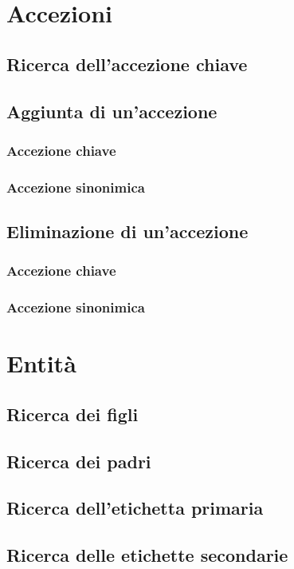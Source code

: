 \documentclass[10pt,a4paper,headinclude,footinclude,hidelinks]{scrreprt} %
\begin{document}
	\section{Accezioni}
	\subsection{Ricerca dell'accezione chiave}
	\subsection{Aggiunta di un'accezione}
	\subsubsection{Accezione chiave}
	\subsubsection{Accezione sinonimica}
	\subsection{Eliminazione di un'accezione}
	\subsubsection{Accezione chiave}
	\subsubsection{Accezione sinonimica}

	\section{Entit\`a}
	\subsection{Ricerca dei figli}
	\subsection{Ricerca dei padri}
	\subsection{Ricerca dell'etichetta primaria}
	\subsection{Ricerca delle etichette secondarie}
\end{document}
